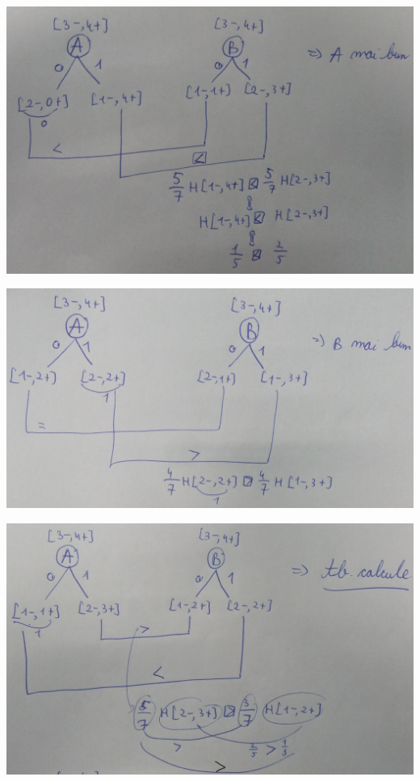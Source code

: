 \documentclass[12pt]{article}
\begin{document}
\begin{enumerate}
\begin{enumerate}
\begin{itemize}
				\begin{center}
					\includegraphics[width=1\linewidth]{screenshot005}
				\end{center}
				\begin{center}
					\includegraphics[width=1\linewidth]{screenshot006}
				\end{center}
				\begin{center}
					\includegraphics[width=1\linewidth]{screenshot007}

\end{center}
\end{itemize}
\end{enumerate}
\end{enumerate}
\end{document}
